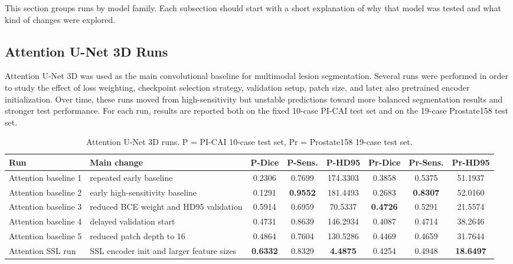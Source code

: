 \documentclass[11pt,a4paper]{article}
\begin{document}
This section groups runs by model family. Each subsection should start with a short explanation of why that model was tested and what kind of changes were explored.

\subsection{Attention U-Net 3D Runs}

Attention U-Net 3D was used as the main convolutional baseline for multimodal lesion segmentation. Several runs were performed in order to study the effect of loss weighting, checkpoint selection strategy, validation setup, patch size, and later also pretrained encoder initialization. Over time, these runs moved from high-sensitivity but unstable predictions toward more balanced segmentation results and stronger test performance. For each run, results are reported both on the fixed 10-case PI-CAI test set and on the 19-case Prostate158 test set.

\begin{table}[H]
\centering
\scriptsize
\begin{tabular}{>{\raggedright\arraybackslash}p{} >{\raggedright\arraybackslash}p{} c c c c c c}
\toprule
Run & Main change & P-Dice & P-Sens. & P-HD95 & Pr-Dice & Pr-Sens. & Pr-HD95 \\
\midrule
Attention baseline 1 & repeated early baseline & 0.2306 & 0.7699 & 174.3303 & 0.3858 & 0.5375 & 51.1937 \\
Attention baseline 2 & early high-sensitivity baseline & 0.1291 & \textbf{0.9552} & 181.4493 & 0.2683 & \textbf{0.8307} & 52.0160 \\
Attention baseline 3 & reduced BCE weight and HD95 validation & 0.5914 & 0.6959 & 70.5337 & \textbf{0.4726} & 0.5291 & 21.5574 \\
Attention baseline 4 & delayed validation start & 0.4731 & 0.8639 & 146.2934 & 0.4087 & 0.4714 & 38.2646 \\
Attention baseline 5 & reduced patch depth to 16 & 0.4864 & 0.7604 & 130.5286 & 0.4469 & 0.4659 & 31.7644 \\
Attention SSL run & SSL encoder init and larger feature sizes & \textbf{0.6332} & 0.8329 & \textbf{4.4875} & 0.4254 & 0.4948 & \textbf{18.6497} \\
\bottomrule
\end{tabular}
\caption{Attention U-Net 3D runs. P = PI-CAI 10-case test set, Pr = Prostate158 19-case test set.}
\normalsize
\end{table}
\end{document}
